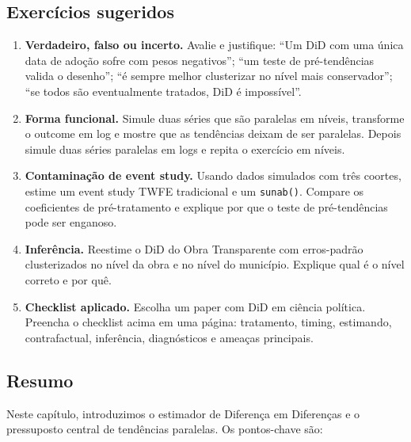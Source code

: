 \documentclass[
]{article}
\begin{document}
\subsection{Exercícios sugeridos}\label{exercuxedcios-sugeridos}

\begin{enumerate}
\def\labelenumi{\arabic{enumi}.}
\item
  \textbf{Verdadeiro, falso ou incerto.} Avalie e justifique: ``Um DiD com uma única data de adoção sofre com pesos negativos''; ``um teste de pré-tendências valida o desenho''; ``é sempre melhor clusterizar no nível mais conservador''; ``se todos são eventualmente tratados, DiD é impossível''.
\item
  \textbf{Forma funcional.} Simule duas séries que são paralelas em níveis, transforme o outcome em log e mostre que as tendências deixam de ser paralelas. Depois simule duas séries paralelas em logs e repita o exercício em níveis.
\item
  \textbf{Contaminação de event study.} Usando dados simulados com três coortes, estime um event study TWFE tradicional e um \texttt{sunab()}. Compare os coeficientes de pré-tratamento e explique por que o teste de pré-tendências pode ser enganoso.
\item
  \textbf{Inferência.} Reestime o DiD do Obra Transparente com erros-padrão clusterizados no nível da obra e no nível do município. Explique qual é o nível correto e por quê.
\item
  \textbf{Checklist aplicado.} Escolha um paper com DiD em ciência política. Preencha o checklist acima em uma página: tratamento, timing, estimando, contrafactual, inferência, diagnósticos e ameaças principais.
\end{enumerate}

\subsection{Resumo}\label{resumo}

Neste capítulo, introduzimos o estimador de Diferença em Diferenças e o pressuposto central de tendências paralelas. Os pontos-chave são:
\end{document}
